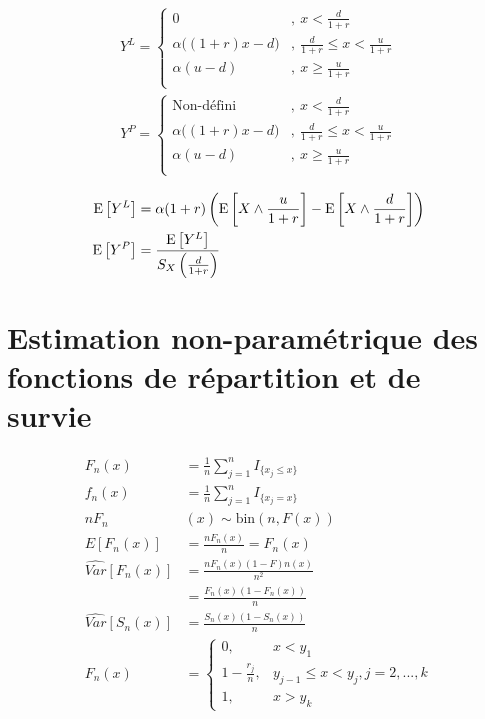 \documentclass[french, landscape]{article}
\begin{document}
\begin{multicols*}{3}
\begin{align*}
Y^L = 
\begin{cases}
0		& ,\ x  < \frac{d}{1+r} \\
\alpha \Big( (1+r) x - d \Big)	& ,\ \frac{d}{1+r} \leq x < \frac{u}{1+r} \\
\alpha (u-d)		& ,\ x \geq \frac{u}{1+r} \\
\end{cases}
\end{align*}
\begin{align*}
Y^P = 
\begin{cases}
\text{Non-défini}		& ,\ x  < \frac{d}{1+r} \\
\alpha \Big( (1+r) x - d \Big)	& ,\ \frac{d}{1+r} \leq x < \frac{u}{1+r} \\
\alpha (u-d)		& ,\ x \geq \frac{u}{1+r} \\
\end{cases}
\end{align*}

\begin{align*}
\mathrm{E} \left[ Y^L \right] &= \alpha (1+r) \left( \mathrm{E} \left[ X \wedge \frac{u}{1+r} \right] - \mathrm{E} \left[ X \wedge \frac{d}{1+r} \right]   \right) \\
\mathrm{E} \left[ Y^P \right] &= \frac{\mathrm{E} \left[ Y^L \right]}{S_X \left( \frac{d}{1+r} \right)}
\end{align*}

\setcounter{section}{13}
\section{Estimation non-paramétrique des fonctions de répartition et de survie}
\begin{align*}
F_n(x) &= \frac{1}{n} \sum\limits_{j=1}^n I_{\{ x_j \leq x\}} \\
f_n(x) &= \frac{1}{n} \sum\limits_{j=1}^n I_{\{ x_j = x\}}  \\
 n F_n&(x)  \sim \text{bin}(n, F(x))\\
E[F_n(x)] &= \frac{n F_n(x)}{n} = F_n(x)\\
\widehat{Var}[F_n(x)] &= \frac{n F_n(x)(1 - F)n(x)}{n^2} \\
       &= \frac{F_n(x)(1 - F_n(x))}{n}  \\
\widehat{Var}[S_n(x)] &= \frac{S_n(x)(1 - S_n(x))}{n} \\
F_n(x) &= 
\left\{
	\begin{array}{ll}
		0,  &  x < y_1 \\
        1 - \frac{r_j}{n}, &  y_{j-1} \leq x < y_j, j=2,...,k \\
        1, & x > y_k 
	\end{array}
\right.
\end{align*}


\end{multicols*}
\end{document}

